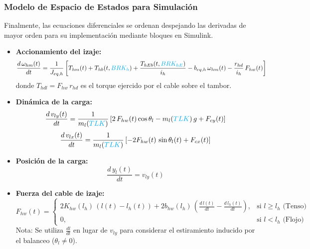 \documentclass[11pt]{article}                                    %
\begin{document}
\subsubsection{Modelo de Espacio de Estados para Simulación}
Finalmente, las ecuaciones diferenciales se ordenan despejando las derivadas de mayor orden para su implementación mediante bloques en Simulink.
\begin{itemize}
    \item \textbf{Accionamiento del izaje:}
    \begin{equation}\label{accionamiento_izaje}
        \frac{d\,\omega_{hm}(t)}{dt}
        = \frac{1}{J_{eq,h}}
        \left[
            T_{hm}(t)
            + T_{hb}(t,\textcolor{cyan}{BRK_h})
            + \frac{T_{hEb}(t,\textcolor{cyan}{BRK_{hE}})}{i_h}
            - b_{eq,h}\,\omega_{hm}(t)
            - \frac{r_{hd}}{i_h} \, F_{hw}(t)
        \right]
    \end{equation}
    donde $T_{hdl} = F_{hw}\,r_{hd}$ es el torque ejercido por el cable sobre el tambor.

    \item \textbf{Dinámica de la carga:}
    \begin{equation}\label{v_vertical}
        \frac{d\,v_{ly}(t)}{dt}
        = \frac{1}{m_l(\textcolor{cyan}{TLK})}
        \left[
            2\,F_{hw}(t)\cos\theta_l
            - m_l(\textcolor{cyan}{TLK})\,g
            + F_{cy}(t)
        \right]
    \end{equation}
    \begin{equation}\label{v_horizontal}
        \frac{d\,v_{lx}(t)}{dt}
        = \frac{1}{m_l(\textcolor{cyan}{TLK})}\left[-2 F_{hw}(t) \, \sin\theta_l(t) + F_{cx}(t)\right]
    \end{equation}

    \item \textbf{Posición de la carga:}
    \begin{equation}
        \frac{d\,y_l(t)}{dt} = v_{ly}(t)
    \end{equation}

    \item \textbf{Fuerza del cable de izaje:}
    \begin{equation}
        F_{hw}(t) =
        \begin{cases}
            2 K_{hw}(l_h) \, \left( l(t) - l_h(t) \right)
            + 2 b_{hw}(l_h) \, \left( \frac{d \, l(t)}{dt} - \frac{d \, l_h(t)}{dt} \right),
            & \text{si } l \ge l_h \text{ (Tenso)} \\[6pt]
            0, & \text{si } l < l_h \text{ (Flojo)}
        \end{cases}
    \end{equation}
    Nota: Se utiliza $\frac{dl}{dt}$ en lugar de $v_{ly}$ para considerar el estiramiento inducido por el balanceo ($\theta_l \neq 0$).


\end{itemize}
\end{document}
